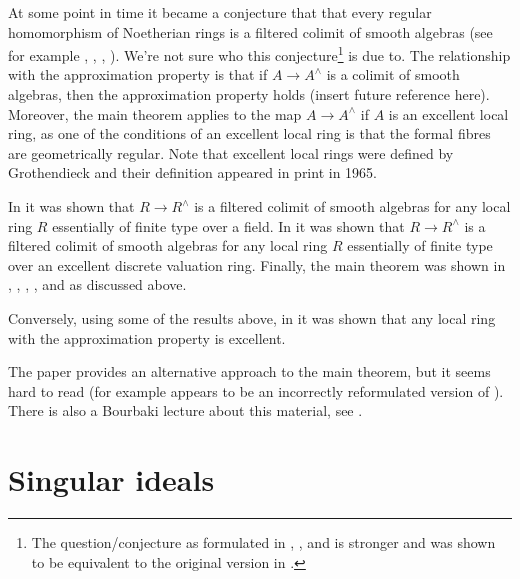 \medskip\noindent
At some point in time it became a conjecture that
that every regular homomorphism of Noetherian rings is a
filtered colimit of smooth algebras (see for example
\cite{Raynaud-Rennes}, \cite{popescu-global}, \cite{Artin-power-series},
\cite{Artin-Denef}). We're not sure who this conjecture\footnote{The
question/conjecture as formulated in \cite{Artin-power-series},
\cite{Artin-Denef}, and \cite{popescu-global} is stronger and was shown
to be equivalent to the original version in \cite{Cipu}.}
is due to. The relationship with the approximation property is that if
$A \to A^\wedge$ is a colimit of smooth algebras, then the approximation
property holds (insert future reference here). Moreover, the main theorem
applies to the map $A \to A^\wedge$ if $A$ is an excellent local ring, as one
of the conditions of an excellent local ring is that the formal
fibres are geometrically regular. Note that excellent local rings
were defined by Grothendieck and their definition appeared in
print in 1965.

\medskip\noindent
In \cite{Artin-power-series} it was shown that
$R \to R^\wedge$ is a filtered colimit of smooth algebras for any
local ring $R$ essentially of finite type over a field.
In \cite{Rotthaus-Artin} it was shown that $R \to R^\wedge$
is a filtered colimit of smooth algebras for any local ring $R$
essentially of finite type over an excellent discrete valuation ring.
Finally, the main theorem was shown in
\cite{popescu-GND}, \cite{popescu-GNDA}, \cite{popescu-letter}, 
\cite{Ogoma}, and \cite{swan} as discussed above.

\medskip\noindent
Conversely, using some of the results above, in \cite{Rotthaus-excellent}
it was shown that any local ring with the approximation property is excellent.

\medskip\noindent
The paper \cite{Spivakovsky} provides an alternative approach to the
main theorem, but it seems hard to read (for example
\cite[Lemma 5.2]{Spivakovsky} appears to be an incorrectly reformulated
version of \cite[Lemma 3]{Elkik}). There is also a Bourbaki
lecture about this material, see \cite{Teissier}.












\section{Singular ideals}
\label{section-singular-ideal}

